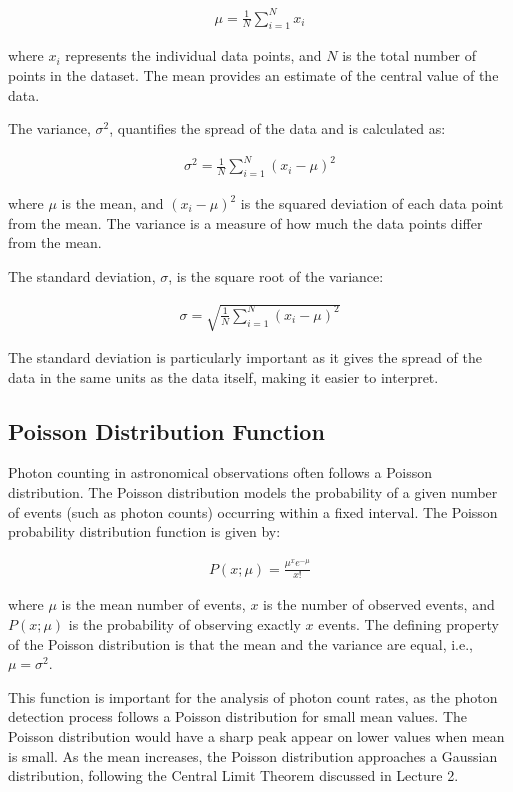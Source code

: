 \documentclass[10pt, preprint]{aastex}
\begin{document}
\begin{align}
    \mu = \frac{1}{N} \sum_{i=1}^{N} x_i
\end{align}

where $x_i$ represents the individual data points, and $N$ is the total number of points in the dataset. The mean provides an estimate of the central value of the data.

The variance, $\sigma^2$, quantifies the spread of the data and is calculated as:

\begin{align}
   \sigma^2 = \frac{1}{N} \sum_{i=1}^{N} (x_i - \mu)^2 
\end{align}


where $\mu$ is the mean, and $(x_i - \mu)^2$ is the squared deviation of each data point from the mean. The variance is a measure of how much the data points differ from the mean.

The standard deviation, $\sigma$, is the square root of the variance:

\begin{align}
    \sigma = \sqrt{\frac{1}{N} \sum_{i=1}^{N} (x_i - \mu)^2}
\end{align}

The standard deviation is particularly important as it gives the spread of the data in the same units as the data itself, making it easier to interpret.

\subsection{Poisson Distribution Function}

Photon counting in astronomical observations often follows a Poisson distribution. The Poisson distribution models the probability of a given number of events (such as photon counts) occurring within a fixed interval. The Poisson probability distribution function is given by:

\begin{align}
    P(x; \mu) = \frac{\mu^x e^{-\mu}}{x!}
\end{align}

where $\mu$ is the mean number of events, $x$ is the number of observed events, and $P(x; \mu)$ is the probability of observing exactly $x$ events. The defining property of the Poisson distribution is that the mean and the variance are equal, i.e., $\mu = \sigma^2$.

This function is important for the analysis of photon count rates, as the photon detection process follows a Poisson distribution for small mean values. The Poisson distribution would have a sharp peak appear on lower values when mean is small. As the mean increases, the Poisson distribution approaches a Gaussian distribution, following the Central Limit Theorem discussed in Lecture 2. 
\end{document}
